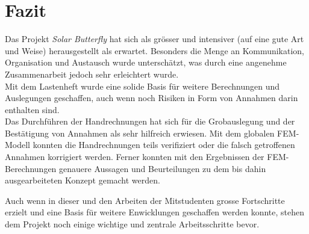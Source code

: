 \newpage

\section{Fazit}
Das Projekt \emph{Solar Butterfly} hat sich als grösser und intensiver (auf eine gute Art und Weise) herausgestellt als erwartet. Besonders die Menge an Kommunikation, Organisation und Austausch wurde unterschätzt, was durch eine angenehme Zusammenarbeit jedoch sehr erleichtert wurde.\\
Mit dem Lastenheft wurde eine solide Basis für weitere Berechnungen und Auslegungen geschaffen, auch wenn noch Risiken in Form von Annahmen darin enthalten sind.\\
Das Durchführen der Handrechnungen hat sich für die Grobauslegung und der Bestätigung von Annahmen als sehr hilfreich erwiesen. Mit dem globalen FEM-Modell konnten die Handrechnungen teils verifiziert oder die falsch getroffenen Annahmen korrigiert werden. Ferner konnten mit den Ergebnissen der FEM-Berechnungen genauere Aussagen und Beurteilungen zu dem bis dahin ausgearbeiteten Konzept gemacht werden.

Auch wenn in dieser und den Arbeiten der Mitstudenten grosse Fortschritte erzielt und eine Basis für weitere Enwicklungen geschaffen werden konnte, stehen dem Projekt noch einige wichtige und zentrale Arbeitsschritte bevor.
\newpage
